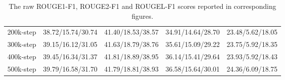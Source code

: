 \begin{table}[hbt!]
\begin{tabular}{ccccc}
    200k-step       & 38.72/15.74/30.74 & 41.40/18.53/38.57 & 34.91/14.64/28.70 & 23.48/5.62/18.05 \\ 
    300k-step       & 39.15/16.12/31.05 & 41.63/18.79/38.76 & 35.61/15.09/29.22 & 23.75/5.92/18.35 \\ 
    400k-step       & 39.45/16.34/31.37 & 41.81/18.89/38.95 & 36.14/15.41/29.64 & 23.93/5.92/18.43 \\ 
    500k-step       & 39.79/16.58/31.70 & 41.79/18.81/38.93 & 36.58/15.64/30.01 & 24.36/6.09/18.75 \\ \hline 
  \end{tabular}
  \caption{The raw ROUGE1-F1, ROUGE2-F1 and ROUGEL-F1 scores reported in corresponding figures.}
  \label{tab:raw_rouge_scores}
\end{table}